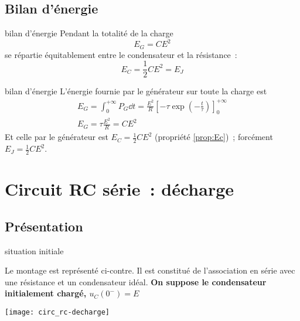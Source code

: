 \documentclass[../main/main.tex]{subfiles}
\begin{document}
\subsection{Bilan d'énergie}
\begin{tcbraster}[raster columns=2, raster equal height=rows]
    \begin{prop}[label=prop:rcenerg-charge]{bilan d'énergie}
        Pendant la totalité de la charge
        $$E_G = CE^2$$
        se répartie équitablement entre le condensateur et la résistance~:
        $$E_C = \frac{1}{2} CE^2 = E_J$$
    \end{prop}
    \begin{demo}[label=demo:rcenerg-charge]{bilan d'énergie}
        L'énergie fournie par le générateur sur toute la charge est
        \begin{gather*}
            E_G = \int_{0}^{+\infty} P_G \dd t =
            \frac{E^2}{R} \left[
                -\tau \exp \left(-\frac{t}{\tau} \right)
            \right]_0^{+\infty}\\
            E_G = \tau \frac{E^2}{R} = CE^2
        \end{gather*}
        Et celle par le générateur est $E_C = \frac{1}{2}CE^2$ (propriété
        \ref{prop:Ec})~; forcément $E_J = \frac{1}{2}CE^2$.
    \end{demo}
\end{tcbraster}

\section{Circuit RC série~: décharge}
\subsection{Présentation}
\begin{defi}[label=def:echelonC, sidebyside, righthand width=.3\linewidth]
    {situation initiale}

    Le montage est représenté ci-contre. Il est constitué de l'association en
    série avec une résistance et un condensateur idéal. \textbf{On suppose le
    condensateur initialement chargé, $u_C(0^-) = E$}

    \tcblower
    \begin{center}
        \texttt{[image: circ\_rc-decharge]}
    \end{center}
\end{defi}
\end{document}
